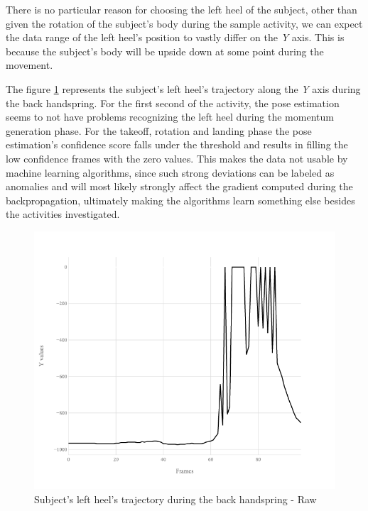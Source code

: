There is no particular reason for choosing the left heel of the subject, other than given the rotation of the subject's body during the sample activity, we can expect the data range of the left heel's position to vastly differ on the \textit{Y} axis. This is because the subject's body will be upside down at some point during the movement.

The figure \ref{lack-17-rasmus-l-heel-y-raw} represents the subject's left heel's trajectory along the \textit{Y} axis during the back handspring. For the first second of the activity, the pose estimation seems to not have problems recognizing the left heel during the momentum generation phase. For the takeoff, rotation and landing phase the pose estimation's confidence score falls under the threshold and results in filling the low confidence frames with the zero values. This makes the data not usable by machine learning algorithms, since such strong deviations can be labeled as anomalies and will most likely strongly affect the gradient computed during the backpropagation, ultimately making the algorithms learn something else besides the activities investigated.

\begin{figure}[htb]
  \centering
    \includegraphics[width=\textwidth,keepaspectratio]
    {images/data-preprocessing/flack-17-rasmus-l-heel-y-raw}
    \caption{Subject's left heel's trajectory during the back handspring - Raw}
    \label{lack-17-rasmus-l-heel-y-raw}
\end{figure}

